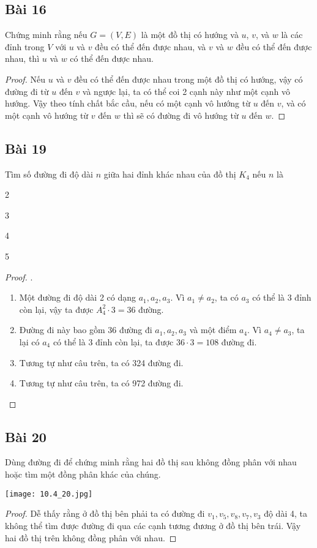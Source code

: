 \subsection*{Bài 16}
Chứng minh rằng nếu $G=(V, E)$ là một đồ thị có hướng và $u$, $v$, và $w$ là các đỉnh trong $V$ với $u$ và $v$ đều có thể đến được nhau, và $v$ và $w$ đều có thể đến được nhau, thì $u$ và $w$ có thể đến được nhau.
\begin{proof}
	Nếu $u$ và $v$ đều có thể đến được nhau trong một đồ thị có hướng, vậy có đường đi từ $u$ đến $v$ và ngược lại, ta có thể coi 2 cạnh này như một cạnh vô hướng. Vậy theo tính chất bắc cầu, nếu có một cạnh vô hướng từ $u$ đến $v$, và có một cạnh vô hướng từ $v$ đến $w$ thì sẽ có đường đi vô hướng từ $u$ đến $w$.
\end{proof}
\subsection*{Bài 19}
Tìm số đường đi độ dài $n$ giữa hai đỉnh khác nhau của đồ thị $K_4$ nếu $n$ là
\begin{enumerate}[label=\alph*)]
	\begin{multicols}{4}
		\item 2
		\item 3
		\item 4
		\item 5
	\end{multicols}
\end{enumerate}
\begin{proof}.
\begin{enumerate}[label=\alph*)]
	\item Một đường đi độ dài 2 có dạng $a_1,a_2,a_3$. Vì $a_1\neq a_2$, ta có $a_3$ có thể là 3 đỉnh còn lại, vậy ta được $A^2_4\cdot3=36$ đường.
	\item Đường đi này bao gồm 36 đường đi $a_1,a_2,a_3$ và một điểm $a_4$. Vì $a_4\neq a_3$, ta lại có $a_4$ có thể là 3 đỉnh còn lại, ta được $36\cdot3=108$ đường đi.
	\item Tương tự như câu trên, ta có 324 đường đi.
	\item Tương tự như câu trên, ta có 972 đường đi.
\end{enumerate}
\end{proof}
\subsection*{Bài 20}
Dùng đường đi để chứng minh rằng hai đồ thị sau không đồng phân với nhau hoặc tìm một đồng phân khác của chúng.
\begin{center}
	\texttt{[image: 10.4\_20.jpg]}
\end{center}
\begin{proof}
	Dễ thấy rằng ở đồ thị bên phải ta có đường đi $v_1,v_5,v_8,v_7,v_3$ độ dài 4, ta không thể tìm được đường đi qua các cạnh tương đương ở đồ thị bên trái. Vậy hai đồ thị trên không đồng phân với nhau.
\end{proof}
